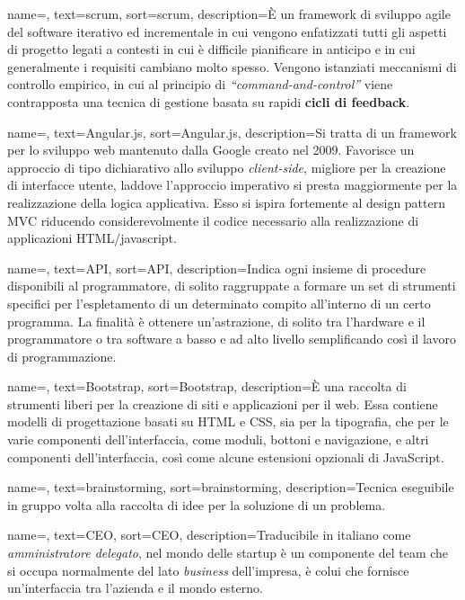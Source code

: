 {
    name=,
    text=scrum,
    sort=scrum,
    description={È un framework di sviluppo agile del software iterativo ed incrementale in cui vengono enfatizzati tutti gli aspetti di progetto legati a contesti in cui è difficile pianificare in anticipo e in cui generalmente i requisiti cambiano molto spesso. Vengono istanziati meccanismi di controllo empirico, in cui al principio di \textit{``command-and-control''} viene contrapposta una tecnica di gestione basata su rapidi \textbf{cicli di feedback}.}
}

{
    name=,
    text=Angular.js,
    sort=Angular.js,
    description={Si tratta di un framework per lo sviluppo web mantenuto dalla Google creato nel 2009. Favorisce un approccio di tipo dichiarativo allo sviluppo \textit{client-side}, migliore per la creazione di interfacce utente, laddove l'approccio imperativo si presta maggiormente per la realizzazione della logica applicativa. Esso si ispira fortemente al design pattern MVC riducendo considerevolmente il codice necessario alla realizzazione di applicazioni HTML/javascript.}
}

{
    name=,
    text=API,
    sort=API,
    description={Indica ogni insieme di procedure disponibili al programmatore, di solito raggruppate a formare un set di strumenti specifici per l’espletamento di un determinato compito all’interno di un certo programma. La finalità è ottenere un’astrazione, di solito tra l’hardware e il programmatore o tra software a basso e ad alto livello semplificando così il lavoro di programmazione.}
}

{
    name=,
    text=Bootstrap,
    sort=Bootstrap,
    description={È una raccolta di strumenti liberi per la creazione di siti e applicazioni per il web. Essa contiene modelli di progettazione basati su HTML e CSS, sia per la tipografia, che per le varie componenti dell'interfaccia, come moduli, bottoni e navigazione, e altri componenti dell'interfaccia, così come alcune estensioni opzionali di JavaScript.}
}

{
    name=,
    text=brainstorming,
    sort=brainstorming,
    description={Tecnica eseguibile in gruppo volta alla raccolta di idee per la soluzione di un problema.}
}

{
    name=,
    text=CEO,
    sort=CEO,
    description={Traducibile in italiano come \textit{amministratore delegato}, nel mondo delle startup è un componente del team che si occupa normalmente del lato \textit{business} dell'impresa, è colui che fornisce un'interfaccia tra l'azienda e il mondo esterno.}
}

